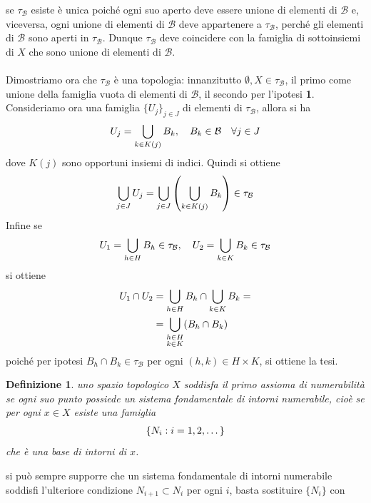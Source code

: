 \documentclass[oneside, 11pt]{amsbook}
\makeatletter
\newcommand{\0}{{(0)}}
\newcommand{\3}{{(3)}}
\theoremstyle{colonplain}
\theoremstyle{colondefinition}
\newtheorem{defn}[thm]{Definizione}
\theoremstyle{colonremark}
\numberwithin{equation}{chapter}
\renewcommand{\proofname}{Dimostrazione}
\renewenvironment{proof}[1][\proofname]{\par
  \pushQED{\end{proof}}%
  \normalfont \topsep6\p@\@plus6\p@\relax
  \trivlist
  \item[\hskip\labelsep\bfseries #1:]\ignorespaces
}{%
  \popQED\endtrivlist\@endpefalse
}
\makeatother
\begin{document}
\begin{proof} se $\tau_\mathcal{B}$ esiste è unica poiché ogni suo aperto deve essere unione di elementi di $\mathcal{B}$ e, viceversa, ogni unione di elementi di $\mathcal{B}$ deve appartenere a $\tau_\mathcal{B}$, perché gli elementi di $\mathcal{B}$ sono aperti in $\tau_\mathcal{B}$. Dunque $\tau_\mathcal{B}$ deve coincidere con la famiglia di sottoinsiemi di $X$ che sono unione di elementi di $\mathcal{B}$. \\ \\
Dimostriamo ora che $\tau_\mathcal{B}$ è una topologia: innanzitutto $\emptyset, X \in \tau_\mathcal{B}$, il primo come unione della famiglia vuota di elementi di $\mathcal{B}$, il secondo per l'ipotesi \textbf{1}. Consideriamo ora una famiglia $\{ U_j \}_{j \in J}$ di elementi di $\tau_\mathcal{B}$, allora si ha
\begin{align}
    U_j = \bigcup_{k \in K(j)} B_k, \quad B_k \in \mathcal{B} \quad \forall j \in J \notag
\end{align}
dove $K(j)$ sono opportuni insiemi di indici. Quindi si ottiene
\begin{align}
    \bigcup_{j \in J} U_j = \bigcup_{j \in J} \left( \bigcup_{k \in K(j)} B_k \right) \in \tau_\mathcal{B} \notag
\end{align}
Infine se
\begin{align}
    U_1 = \bigcup_{h \in H} B_h \in \tau_\mathcal{B}, \quad U_2 = \bigcup_{k \in K} B_k \in \tau_\mathcal{B} \notag
\end{align}
si ottiene
\begin{align}
    U_1 \cap U_2 &= \bigcup_{h \in H} B_h \cap \bigcup_{k \in K} B_k = \notag \\
    &= \bigcup_{\substack{h \in H \\ k \in K}} (B_h \cap B_k) \notag
\end{align}
poiché per ipotesi $B_h \cap B_k \in \tau_\mathcal{B}$ per ogni $(h, k) \in H \times K$, si ottiene la tesi.
\end{proof}
\begin{defn}
uno spazio topologico $X$ soddisfa \textit{il primo assioma di numerabilità} se ogni suo punto possiede un sistema fondamentale di intorni numerabile, cioè se per ogni $x \in X$ esiste una famiglia
\begin{align}
    \{ N_i : i = 1, 2, \dots \} \notag
\end{align}
che è una base di intorni di $x$.
\end{defn}
si può sempre supporre che un sistema fondamentale di intorni numerabile soddisfi l'ulteriore condizione $N_{i + 1} \subset N_i$ per ogni $i$, basta sostituire $\{ N_i \}$ con
\end{document}
